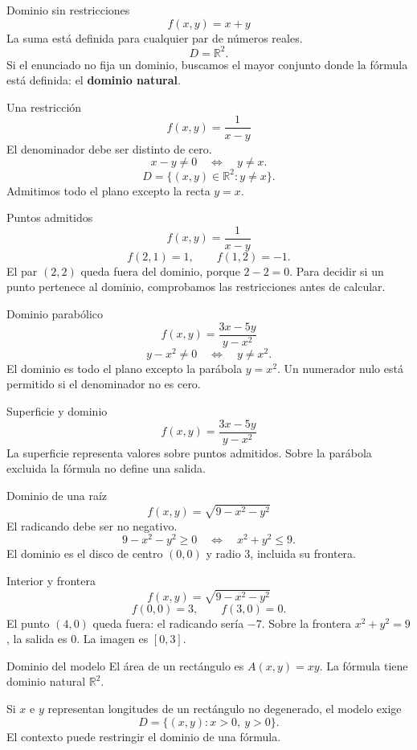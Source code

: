 \begin{frame}{Dominio sin restricciones}
\[f(x,y)=x+y\]
La suma está definida para cualquier par de números reales.
\[D=\mathbb R^2.\]
Si el enunciado no fija un dominio, buscamos el mayor conjunto donde la fórmula está definida: el \textbf{dominio natural}.
\end{frame}
\begin{frame}{Una restricción}
\[f(x,y)=\frac1{x-y}\]
El denominador debe ser distinto de cero.
\[x-y\ne0\quad\Longleftrightarrow\quad y\ne x.\]
\[D=\{(x,y)\in\mathbb R^2:y\ne x\}.\]
Admitimos todo el plano excepto la recta $y=x$.
\end{frame}
\begin{frame}{Puntos admitidos}
\[f(x,y)=\frac1{x-y}\]
\[f(2,1)=1,\qquad f(1,2)=-1.\]
El par $(2,2)$ queda fuera del dominio, porque $2-2=0$.
\medskip
Para decidir si un punto pertenece al dominio, comprobamos las restricciones antes de calcular.
\end{frame}
\begin{frame}{Dominio parabólico}
\[f(x,y)=\frac{3x-5y}{y-x^2}\]
\[y-x^2\ne0\quad\Longleftrightarrow\quad y\ne x^2.\]
El dominio es todo el plano excepto la parábola $y=x^2$.
\medskip
Un numerador nulo está permitido si el denominador no es cero.
\end{frame}
\begin{frame}{Superficie y dominio}
\[f(x,y)=\frac{3x-5y}{y-x^2}\]
La superficie representa valores sobre puntos admitidos. Sobre la parábola excluida la fórmula no define una salida.
\end{frame}
\begin{frame}{Dominio de una raíz}
\[f(x,y)=\sqrt{9-x^2-y^2}\]
El radicando debe ser no negativo.
\[9-x^2-y^2\ge0\quad\Longleftrightarrow\quad x^2+y^2\le9.\]
El dominio es el disco de centro $(0,0)$ y radio $3$, incluida su frontera.
\end{frame}
\begin{frame}{Interior y frontera}
\[f(x,y)=\sqrt{9-x^2-y^2}\]
\[f(0,0)=3,\qquad f(3,0)=0.\]
El punto $(4,0)$ queda fuera: el radicando sería $-7$.
\medskip
Sobre la frontera $x^2+y^2=9$, la salida es $0$. La imagen es $[0,3]$.
\end{frame}
\begin{frame}{Dominio del modelo}
El área de un rectángulo es $A(x,y)=xy$.
\medskip
La fórmula tiene dominio natural $\mathbb R^2$.

Si $x$ e $y$ representan longitudes de un rectángulo no degenerado, el modelo exige
\[D=\{(x,y):x>0,\ y>0\}.\]
El contexto puede restringir el dominio de una fórmula.
\end{frame}
